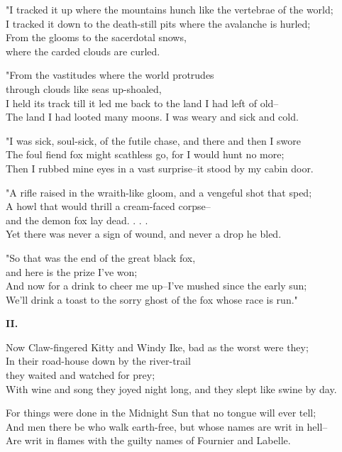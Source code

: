 \begin{poemblock}
"I tracked it up where the mountains hunch like the vertebrae of the world;\\
I tracked it down to the death-still pits where the avalanche is hurled;\\
From the glooms to the sacerdotal snows,\\
\idt where the carded clouds are curled.

"From the vastitudes where the world protrudes\\
\idt through clouds like seas up-shoaled,\\
I held its track till it led me back to the land I had left of old--\\
The land I had looted many moons.  I was weary and sick and cold.

"I was sick, soul-sick, of the futile chase, and there and then I swore\\
The foul fiend fox might scathless go, for I would hunt no more;\\
Then I rubbed mine eyes in a vast surprise--it stood by my cabin door.

"A rifle raised in the wraith-like gloom, and a vengeful shot that sped;\\
A howl that would thrill a cream-faced corpse--\\
\idt and the demon fox lay dead. . . .\\
Yet there was never a sign of wound, and never a drop he bled.

"So that was the end of the great black fox,\\
\idt and here is the prize I've won;\\
And now for a drink to cheer me up--I've mushed since the early sun;\\
We'll drink a toast to the sorry ghost of the fox whose race is run."

\textbf{II.}

Now Claw-fingered Kitty and Windy Ike, bad as the worst were they;\\
In their road-house down by the river-trail\\
\idt they waited and watched for prey;\\
With wine and song they joyed night long, and they slept like swine by day.

For things were done in the Midnight Sun that no tongue will ever tell;\\
And men there be who walk earth-free, but whose names are writ in hell--\\
Are writ in flames with the guilty names of Fournier and Labelle.


\end{poemblock}
